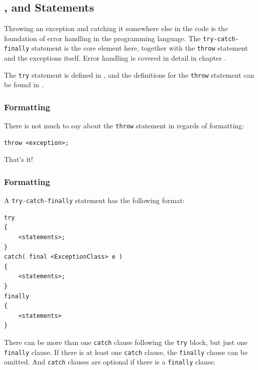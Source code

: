 \subsection{,  and  Statements}\label{sec:TheTryCatchStatements}
Throwing an exception and catching it somewhere else in the code is the foundation of error handling in the \Java programming language. The \verb#try-catch-finally# statement is the core element here, together with the \lstinline|throw| statement and the exceptions itself. Error handling is covered in detail in chapter .

The \lstinline|try| statement is defined in \autocite{ORACLE_DOC_LANGUAGE_SPECIFICATION:Try}, and the definitions for the \lstinline|throw| statement can be found in \autocite{ORACLE_DOC_LANGUAGE_SPECIFICATION:Throw}.

\subsubsection{Formatting }
There is not much to say about the \lstinline|throw| statement in regards of formatting:

\begin{lstlisting}
throw <exception>;
\end{lstlisting}

That's it!

\subsubsection{Formatting }
A \verb#try-catch-finally# statement has the following format:
\begin{lstlisting}
try
{
    <statements>;
}
catch( final <ExceptionClass> e )
{
    <statements>;
}
finally
{
    <statements>
}
\end{lstlisting}
There can be more than one \lstinline|catch| clause following the \lstinline|try| block, but just one \lstinline|finally| clause. If there is at least one \lstinline|catch| clause, the \lstinline|finally| clause can be omitted. And \lstinline|catch| clauses are optional if there is a \lstinline|finally| clause.

